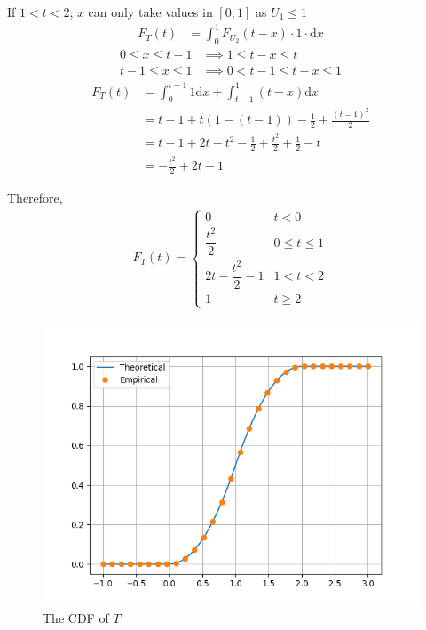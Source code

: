 \documentclass[journal,12pt,twocolumn]{IEEEtran}
\providecommand{\der}[1]{\mathrm{d} #1}
\numberwithin{equation}{section}
\renewcommand\thesection{\arabic{section}}
\begin{document}
\begin{enumerate}[label=\thesection.\arabic*,ref=\thesection.\theenumi]
	If $1 < t < 2$, $x$ can only take values in $[0,1]$ as $U_1 \le 1$
	\begin{align}
		F_T(t)	&= \int_0^1 F_{U_2}(t-x) \cdot 1 \cdot \der{x} 
	\end{align}
	\begin{align}
		0 \le x \le t - 1 &\implies 1 \le t - x \le t \\
		t - 1 \le x \le 1 &\implies 0 < t - 1 \le t - x \le 1
	\end{align}
	\begin{align}
		F_T(t) &= \int_0^{t-1} 1 \der{x} + \int_{t-1}^1 (t-x)\der{x} \\
		&= t - 1 + t(1 - (t - 1)) - \frac{1}{2} + \frac{(t-1)^2}{2} \\
		&= t - 1 + 2t - t^2 -\frac{1}{2} + \frac{t^2}{2} + \frac{1}{2} - t \\ 
		&= -\frac{t^2}{2} + 2t - 1
	\end{align}
	
	Therefore,
	\begin{align}
		F_T(t) = 
		\begin{cases}
		0 & t < 0 \\
		\dfrac{t^2}{2} & 0 \le t \le 1 \\
		 2t -\dfrac{t^2}{2} - 1 & 1 < t < 2 \\
		1 & t \ge 2
		\end{cases}
	\end{align}
	
	\begin{figure}
		\centering
		\includegraphics[width=\columnwidth]{./figs/4.2.png}
		\caption{The CDF of $T$}
		\label{fig-4.2}
	\end{figure}	
	

\end{enumerate}
\end{document}
